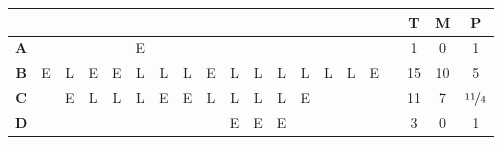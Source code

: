 \begin{ejercicio}
    \begin{table}[H]
        \begin{tabular}{ccccccccccccccccc|ccc}
                                        &                        &                                &                                &                                &                          &                        &                                &                                &                                &                          &                         &                                &                                &                                &                         &    & \textbf{T} & \textbf{M} & \textbf{P} \\ \hline
        \multicolumn{1}{c|}{\textbf{A}} &                        &                                &                                &                                & E                        &                        &                                &                                &                                &                          &                         &                                &                                &                                &                         &    & 1          & 0          & 1          \\ \hline
        \multicolumn{1}{c|}{\textbf{B}} & E                      & {\color[HTML]{F56B00} L}       & E                              & E                              & {\color[HTML]{FE0000} L} & L                      & L                              & E                              & L                              & L                        & L                       & L                              & L                              & L                              & E                       &    & 15         & 10         & 5          \\ \hline
        \multicolumn{1}{c|}{\textbf{C}} &                        & E                              & {\color[HTML]{F56B00} L}       & L                              & L                        & E                      & E                              & {\color[HTML]{FE0000} L}       & L                              & L                        & L                       & E                              &                                &                                &                         &    & 11         & 7          & $\nicefrac{11}{4}$       \\ \hline
        \multicolumn{1}{c|}{\textbf{D}} &                        &                                &                                &                                &                          &                        &                                &                                & E                              & {\color[HTML]{F56B00} E} & E                       &                                &                                &                                &                         &    & 3          & 0          & 1          \\ \hline

\end{tabular}
\end{table}
\end{ejercicio}
